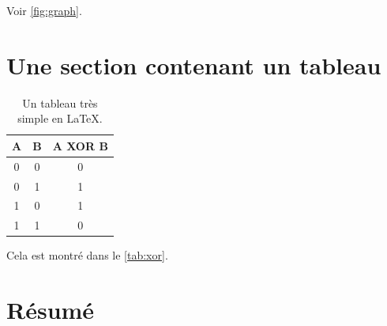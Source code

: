 \lipsum  %

Voir \autoref{fig:graph}.


\section{Une section contenant un tableau}

\lipsum  %

\begin{table}[ht]
\center
\begin{tabular}{cc|c}
A & B & A XOR B\\
\hline
0 & 0 & 0\\
0 & 1 & 1\\
1 & 0 & 1\\
1 & 1 & 0\\
\end{tabular}
\caption{Un tableau très simple en \LaTeX.}
\label{tab:xor}
\end{table}

\lipsum  %

Cela est montré dans le \autoref{tab:xor}.


\section{Résumé}

\lipsum  %
